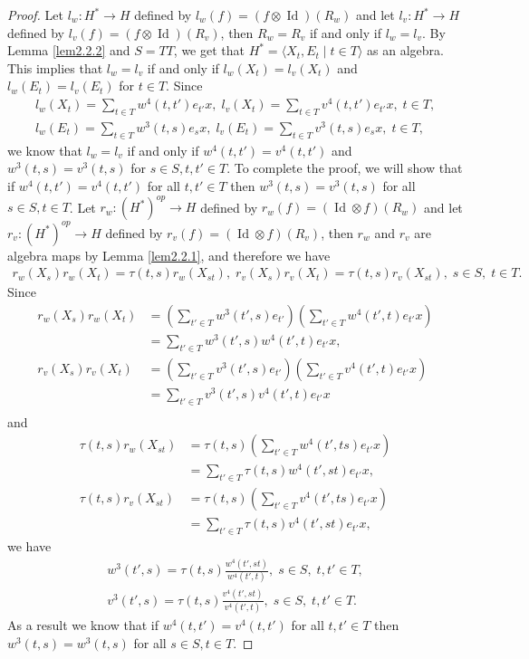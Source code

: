 \documentclass[a4paper,11pt]{amsart}
\def \id{\operatorname{Id}}
\def \id{\operatorname{Id}}
\numberwithin{equation}{section}
\begin{document}
\begin{proof}
Let $l_w:H^*\rightarrow H$ defined by $l_w(f)=(f \otimes \id)(R_w)$ and let $l_v:H^*\rightarrow H$ defined by $l_v(f)=(f \otimes \id)(R_v)$, then $R_w=R_v$ if and only if $l_w=l_v$. By Lemma \ref{lem2.2.2} and $S=TT$, we get that $H^*=\langle X_t,E_t\;|\;t\in T\rangle $ as an algebra. This implies that $l_w=l_v$ if and only if $l_w(X_t)=l_v(X_t)$ and $l_w(E_t)=l_v(E_t)$ for $t\in T$. Since
\begin{gather*}
l_w(X_t)=\sum_{t\in T}w^4(t,t')e_{t'}x,\; l_v(X_t)=\sum_{t\in T}v^4(t,t')e_{t'}x,\;t\in T,\\
l_w(E_t)=\sum_{t\in T}w^3(t,s)e_{s}x,\; l_v(E_t)=\sum_{t\in T}v^3(t,s)e_{s}x,\;t\in T,
\end{gather*}
we know that $l_w=l_v$ if and only if $w^4(t,t')=v^4(t,t')$ and $w^3(t,s)=v^3(t,s)$ for $s\in S,t,t'\in T$. To complete the proof, we will show that if $w^4(t,t')=v^4(t,t')$ for all $t,t'\in T$ then $w^3(t,s)=v^3(t,s)$ for all $s\in S,t\in T$. Let $r_w:(H^*)^{op}\rightarrow H$ defined by $r_w(f)=( \id \otimes f )(R_w)$ and let $r_v:(H^*)^{op}\rightarrow H$ defined by $r_v(f)=(\id \otimes f)(R_v)$, then $r_w$ and $r_v$ are algebra maps by Lemma \ref{lem2.2.1}, and therefore we have
\begin{gather*}
r_w(X_s)r_w(X_t)=\tau(t,s)r_w(X_{st}),\; r_v(X_s)r_v(X_t)=\tau(t,s)r_v(X_{st}),\;s\in S,\; t\in T.
\end{gather*}
Since
\begin{align*}
r_w(X_s)r_w(X_t)&=(\sum\limits_{t' \in T}w^3(t',s)e_{t'})(\sum\limits_{t' \in T}w^4(t',t)e_{t'}x)\\
                &=\sum\limits_{t' \in T}w^3(t',s)w^4(t',t)e_{t'}x , \\
r_v(X_s)r_v(X_t)&=(\sum\limits_{t' \in T}v^3(t',s)e_{t'})(\sum\limits_{t' \in T}v^4(t',t)e_{t'}x)\\
                &=\sum\limits_{t' \in T}v^3(t',s)v^4(t',t)e_{t'}x  \\
\end{align*}
and
\begin{align*}
\tau(t,s)r_w(X_{st})&=\tau(t,s)(\sum\limits_{t' \in T}w^4(t',ts)e_{t'}x)\\
                &=\sum\limits_{t' \in T}\tau(t,s)w^4(t',st)e_{t'}x, \\
\tau(t,s)r_v(X_{st})&=\tau(t,s)(\sum\limits_{t' \in T}v^4(t',ts)e_{t'}x)\\
                &=\sum\limits_{t' \in T}\tau(t,s)v^4(t',st)e_{t'}x,
\end{align*}
we have
\begin{gather*}
w^3(t',s)=\tau(t,s)\frac{w^4(t',st)}{w^4(t',t)},\; s\in S,\; t,t'\in T,\\
v^3(t',s)=\tau(t,s)\frac{v^4(t',st)}{v^4(t',t)},\; s\in S,\; t,t'\in T.
\end{gather*}
As a result we know that if $w^4(t,t')=v^4(t,t')$ for all $t,t'\in T$ then $w^3(t,s)=w^3(t,s)$ for all $s\in S,t\in T$.
\end{proof}
\end{document}
